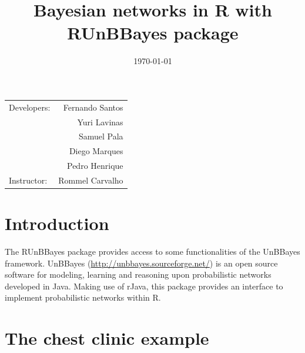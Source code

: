 \documentclass{article}
\title{Bayesian networks in R with RUnBBayes package} %
\date{\today} %
\begin{document}
\maketitle %

\begin{center}
\begin{tabular}{l r}
Developers: & Fernando Santos \\ %
& Yuri Lavinas \\
& Samuel Pala \\
& Diego Marques \\
& Pedro Henrique \\
Instructor: & Rommel Carvalho %
\end{tabular}
\end{center}



\section{Introduction}

The RUnBBayes package provides access to some functionalities of the UnBBayes framework. UnBBayes (\url {http://unbbayes.sourceforge.net/}) is an open source software for modeling, learning and reasoning upon probabilistic networks developed in Java. Making use of rJava, this package provides an interface to implement probabilistic networks within R.




\section{The chest clinic example}
\end{document}
